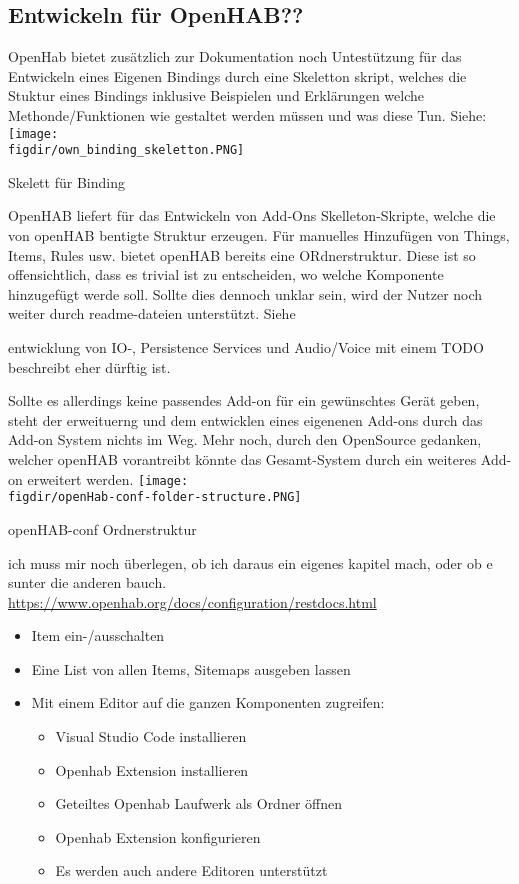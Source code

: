 \subsection{Entwickeln für OpenHAB??} \label{sec:custom-development}


OpenHab bietet zusätzlich zur Dokumentation noch Untestützung für das Entwickeln eines Eigenen Bindings durch eine Skeletton skript, welches die Stuktur eines Bindings inklusive Beispielen und Erklärungen welche Methonde/Funktionen wie gestaltet werden müssen und was diese Tun. Siehe:
\captionsetup{type=figure}
\texttt{[image: \\figdir/own\_binding\_skeletton.PNG]}
\caption{Skelett für Binding \label{fig:own_binding_skeletton}}

OpenHAB liefert für das Entwickeln von Add-Ons Skelleton-Skripte, welche die von openHAB bentigte Struktur erzeugen. Für manuelles Hinzufügen von Things, Items, Rules usw. bietet openHAB bereits eine ORdnerstruktur. Diese ist so offensichtlich, dass es trivial ist zu entscheiden, wo welche Komponente hinzugefügt werde soll. Sollte dies dennoch unklar sein, wird der Nutzer noch weiter durch readme-dateien unterstützt. Siehe 

entwicklung von IO-, Persistence Services und Audio/Voice mit einem TODO beschreibt eher dürftig ist.


Sollte es allerdings keine passendes Add-on für ein gewünschtes Gerät geben, steht der erweituerng und dem entwicklen eines eigenenen Add-ons durch das Add-on System nichts im Weg. Mehr noch, durch den OpenSource gedanken, welcher openHAB vorantreibt könnte das Gesamt-System durch ein weiteres Add-on erweitert werden.
\captionsetup{type=figure}
\texttt{[image: \\figdir/openHab-conf-folder-structure.PNG]}
\caption{openHAB-conf Ordnerstruktur \label{fig:openHab-conf-folder-structure}}



ich muss mir noch überlegen, ob ich daraus ein eigenes kapitel mach, oder ob e sunter die anderen bauch.
\url{https://www.openhab.org/docs/configuration/restdocs.html}
\begin{itemize}
	\item Item ein-/ausschalten
	\item Eine List von allen Items, Sitemaps ausgeben lassen
	\item Mit einem Editor auf die ganzen Komponenten zugreifen:
	\begin{itemize}
		\item Visual Studio Code installieren
		\item Openhab Extension installieren
		\item Geteiltes Openhab Laufwerk als Ordner öffnen
		\item Openhab Extension konfigurieren
		\item Es werden auch andere Editoren unterstützt
	\end{itemize}
\end{itemize}

